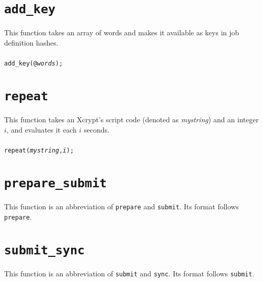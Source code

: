 \documentclass[a4paper,10pt]{report}
\begin{document}
\section{\texttt{add\_key}}

This function takes an array of words and makes it available as keys in job
definition hashes.

\subsubsection{\format}

\begin{boxnote}
\begin{alltt}
add_key(@\textit{words});
\end{alltt}
\end{boxnote}
\vspace{\baselineskip}

\section{\texttt{repeat}}

This function takes an Xcrypt's script code (denoted as
\textit{mystring}) and an integer $i$, and evaluates it each $i$ seconds.

\subsubsection{\format}

\begin{boxnote}
\begin{alltt}
repeat(\textit{mystring}, \textit{i});
\end{alltt}
\end{boxnote}
\vspace{\baselineskip}

\section{\texttt{prepare\_submit}}

This function is an abbreviation of \texttt{prepare} and
\texttt{submit}.  Its format follows \texttt{prepare}.

\section{\texttt{submit\_sync}}

This function is an abbreviation of \texttt{submit} and
\texttt{sync}.  Its format follows \texttt{submit}.
\end{document}
